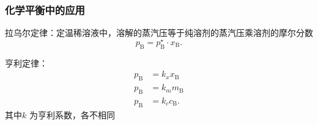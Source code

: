 \subsubsection*{化学平衡中的应用}%
\label{subsub*:化学平衡中的应用}
\begin{notation}
    拉乌尔定律：定温稀溶液中，溶解的蒸汽压等于纯溶剂的蒸汽压乘溶剂的摩尔分数
    \[
        p_\text{B} = p_\text{B}^\star \cdot x_\text{B}
    .\]
\end{notation}
\begin{notation}
    亨利定律：
    \begin{align*}
        p_\text{B} &= k_x x_\text{B}\\
        p_\text{B} &= k_m m_\text{B}\\
        p_\text{B} &= k_c c_\text{B}
    .\end{align*}
    其中$k$ 为亨利系数，各不相同
\end{notation}
